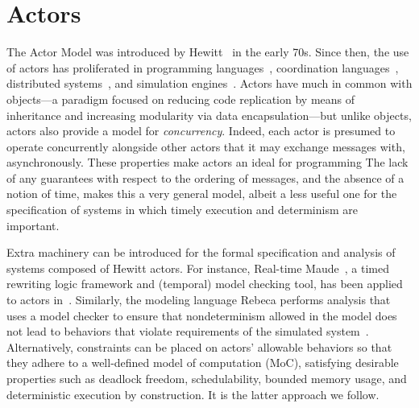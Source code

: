 \documentclass[sigconf]{acmart}
\begin{document}
\section{Actors}
The Actor Model was introduced by Hewitt~\cite{Hewitt:77:Actors} in the early 70s. 
Since then,
the use of actors has proliferated in programming languages~\cite{Armstrong:96:Erlang,haller2009scala,desai2013p}, coordination languages~\cite{Arbab:04:Reo,ARC}, distributed systems~\cite{Hunt2018, DBLP:journals/corr/abs-1712-05889}, and simulation engines~\cite{Ptolemy:14:Book,DBLP:journals/fuin/SirjaniMSB04}. 
Actors have much in common with objects---a paradigm focused on reducing code replication by means of inheritance and increasing modularity via data encapsulation---but unlike objects, actors also provide a model for \emph{concurrency}. 
Indeed, each actor is presumed to operate concurrently alongside other actors that it may exchange messages with, asynchronously. 
These properties make actors an ideal for programming The lack of any guarantees with respect to the ordering of messages, and the absence of a notion of time, makes this a very general model, albeit a less useful one for the specification of systems in which timely execution and determinism are important.

Extra machinery can be introduced for the formal specification and analysis of systems composed of Hewitt actors.
For instance, Real-time Maude~\cite{olveczky:2008:real}, a timed rewriting logic framework and (temporal) model checking tool, has been applied to actors in~\cite{Ding2003}.
Similarly, the modeling language Rebeca performs analysis that uses a model checker to ensure that nondeterminism allowed in the model does not lead to behaviors that violate requirements of the simulated system~\cite{KHAMESPANAH2015184}.
Alternatively, constraints can be placed on actors' allowable behaviors so that they adhere to a well-defined model of computation (MoC), satisfying desirable properties such as deadlock freedom, schedulability, bounded memory usage, and deterministic execution by construction. It is the latter approach we follow.
\end{document}
